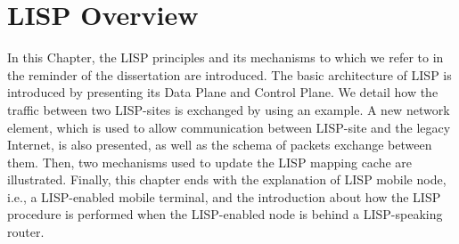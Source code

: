 
\chapter{LISP Overview}
\label{cha:lisp_overview}

\ifpdf
    \graphicspath{{Chapter2/Pics/Raster/}{Chapter2/Pics/PDF/}{Chapter2/}}
\else
    \graphicspath{{Chapter2/Pics/Vector/}{Chapter2/}}
\fi

In this Chapter, the LISP principles and its mechanisms to which we refer to in the reminder of the dissertation are introduced. The basic architecture of LISP is introduced by presenting its Data Plane and Control Plane. We detail how the traffic between two LISP-sites is exchanged by using an example.
A new network element, which is used to allow communication between LISP-site and the legacy Internet, is also presented, as well as the schema of packets exchange between them. Then, two mechanisms used to update the LISP mapping cache are illustrated. Finally, this chapter ends with the explanation of LISP mobile node, i.e., a LISP-enabled mobile terminal, and the introduction about how the LISP procedure is performed when the LISP-enabled node is behind a LISP-speaking router.





